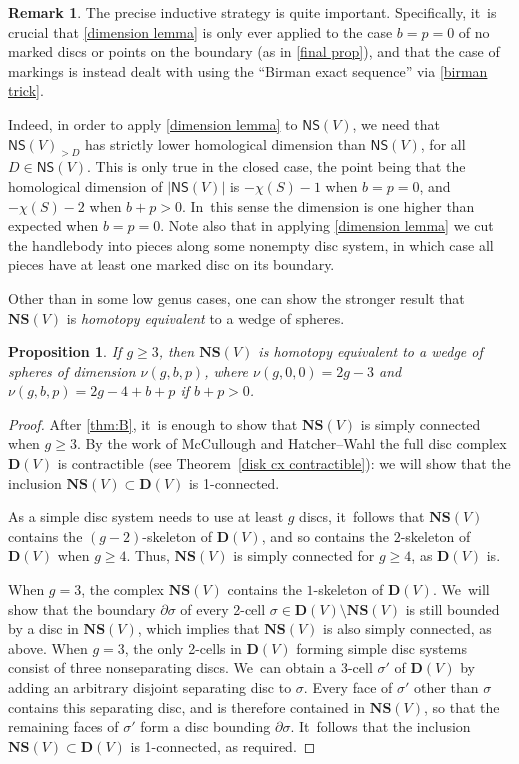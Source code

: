 \documentclass[11pt]{article}
\theoremstyle{plain}
\newtheorem{prop}[thm]{Proposition}
\theoremstyle{definition}
\newtheorem{rem}[thm]{Remark}
\newcommand{\NS}{\mathsf{NS}}
\newcommand{\compNS}{\mathbf{NS}}
\newcommand{\compD}{\mathbf{D}}
\begin{document}
\begin{rem}The precise inductive strategy is quite important. Specifically, it~is crucial that \cref{dimension lemma} is only ever applied to the case $b=p=0$ of no marked discs or points on the boundary (as in \cref{final prop}), and that the case of markings is instead dealt with using the ``Birman exact sequence'' via \cref{birman trick}.

Indeed, in order to apply \cref{dimension lemma} to $\NS(V)$, we need that $\NS(V)_{>D}$ has strictly lower homological dimension than $\NS(V)$, for all $D \in \NS(V)$. This is only true in the closed case, the point being that the homological dimension of $|\NS(V)|$ is $-\chi(S)-1$ when $b=p=0$, and $-\chi(S)-2$ when $b+p>0$. In~this sense the dimension is one higher than expected when $b=p=0$.
Note also that in applying \cref{dimension lemma} we cut the handlebody into pieces along some nonempty disc system, in which case all pieces have at least one marked disc on its boundary.
\end{rem}

Other than in some low genus cases, one can show the stronger result that $\compNS(V)$ is \emph{homotopy equivalent} to a wedge of spheres.

\begin{prop} \label{prop: simple connectivity}
If $g \geq 3$, then $\compNS(V)$ is homotopy equivalent to a wedge of spheres of dimension $\nu(g,b,p)$, where $\nu(g,0,0) = 2g-3$ and $\nu(g,b,p) = 2g-4+b+p$ if $b+p>0$.
\end{prop}

\begin{proof}
After \cref{thm:B}, it~is enough to show that $\compNS(V)$ is simply connected when $g \geq 3$. By the work of McCullough \cite{mccullough} and Hatcher--Wahl \cite{hatcherwahl} the full disc complex $\compD(V)$ is contractible (see Theorem~\ref{disk cx contractible}): we will show that the inclusion $\compNS(V) \subset \compD(V)$ is 1-connected.

As a simple disc system needs to use at least $g$ discs, it~follows that $\compNS(V)$ contains the $(g-2)$-skeleton of $\compD(V)$, and so contains the $2$-skeleton of $\compD(V)$ when $g \geq 4$. Thus, $\compNS(V)$ is simply connected for $g \geq 4$, as $\compD(V)$ is.

When $g=3$, the complex $\compNS(V)$ contains the $1$-skeleton of $\compD(V)$. We~will show that the boundary $\partial \sigma$ of every 2-cell $\sigma \in \compD(V) \setminus \compNS(V)$ is still bounded by a disc in $\compNS(V)$, which implies that $\compNS(V)$ is also simply connected, as above. When $g=3$, the only 2-cells in $\compD(V)$ forming simple disc systems consist of three nonseparating discs. We~can obtain a 3-cell $\sigma'$ of $\compD(V)$ by adding an arbitrary disjoint separating disc to $\sigma$. Every face of $\sigma'$ other than $\sigma$ contains this separating disc, and is therefore contained in $\compNS(V)$, so that the remaining faces of $\sigma'$ form a disc bounding $\partial \sigma$. It~follows that the inclusion $\compNS(V) \subset \compD(V)$ is 1-connected, as required.
\end{proof}
\end{document}
